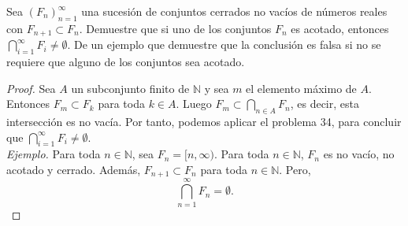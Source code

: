 \documentclass[12pt]{article}
\newcommand{\N}{\mathbb{N}}
\newenvironment{problem}[2][Problema]{\begin{trivlist}
\item[\hskip \labelsep {\bfseries #1}\hskip \labelsep {\bfseries #2.}]}{\end{trivlist}}
\begin{document}
\begin{problem}{35}
Sea $(F_n)_{n=1}^\infty$ una sucesión de conjuntos cerrados no vacíos de números reales con $F_{n+1} \subset F_n$. Demuestre que si uno de los conjuntos $F_n$ es acotado, entonces $\bigcap_{i=1}^\infty F_i  \neq \emptyset.$ De un ejemplo que demuestre que la conclusión es falsa si no se requiere que alguno de los conjuntos sea acotado.

\end{problem}
\begin{proof}
Sea $A$ un subconjunto finito de $\N$ y sea $m$ el elemento máximo de $A$. Entonces $F_m \subset F_k$ para toda $k \in A$. Luego $F_m \subset \bigcap_{n \in A}F_n $, es decir, esta intersección es no vacía. Por tanto, podemos aplicar el problema 34, para concluir que 
$\bigcap_{i=1}^\infty F_i  \neq \emptyset.$\\


\textit{Ejemplo.} Para toda $n\in \N$, sea $F_n = [n, \infty)$.  Para toda $n \in \N$, $F_n$ es no vacío, no acotado y cerrado. Además, $F_{n+1} \subset F_n$ para toda $n\in \N$. Pero,
$$ \bigcap_{n=1}^{\infty}F_n = \emptyset. $$
\end{proof}
\end{document}
